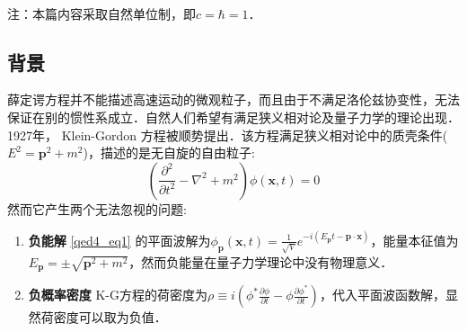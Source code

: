 \\注：本篇内容采取自然单位制，即$c=\hbar=1$．
\subsection{背景}
薛定谔方程并不能描述高速运动的微观粒子，而且由于不满足洛伦兹协变性，无法保证在别的惯性系成立．自然人们希望有满足狭义相对论及量子力学的理论出现．1927年， Klein-Gordon 方程被顺势提出．该方程满足狭义相对论中的质壳条件($E^{2}=\boldsymbol{p}^{2}+m^{2}$)，描述的是无自旋的自由粒子:
\begin{equation}\label{qed4_eq1}
\left(\frac{\partial^{2}}{\partial t^{2}}-\nabla^{2}+m^{2}\right) \phi(\boldsymbol{x}, t)=0
\end{equation}
然而它产生两个无法忽视的问题:

\begin{enumerate}
\item \textbf{负能解}
\autoref{qed4_eq1} 的平面波解为$\phi_{\boldsymbol{p}}(\boldsymbol{x}, t)=\frac{1}{\sqrt{V}} e^{-i\left(E_{\boldsymbol{p}} t-\boldsymbol{p} \cdot \boldsymbol{x}\right)}$，能量本征值为
$E_{\boldsymbol{p}}=\pm \sqrt{\boldsymbol{p}^{2}+m^{2}}$，然而负能量在量子力学理论中没有物理意义．
\item \textbf{负概率密度}
K-G方程的荷密度为$\rho \equiv i\left(\phi^{*} \frac{\partial \phi}{\partial t}-\phi \frac{\partial \phi^{*}}{\partial t}\right)$，代入平面波函数解，显然荷密度可以取为负值．
\end{enumerate}
